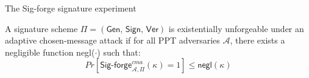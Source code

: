 \begin{algorithm}[h]
		\caption{\label{alg:sig-forge} The \textsf{Sig-forge} signature experiment}
		\begin{algorithmic}[1]
					\State{}
				\EndIf
				\State{}
			\EndFunction
		\end{algorithmic}
\end{algorithm}

\begin{defn}
	\label{def:singature_security}
	A signature scheme $\Pi = (\textsf{Gen, Sign, Ver})$ is \textsf{existentially unforgeable under an adaptive chosen-message attack } if for all PPT adversaries $\mathcal{A}$, there exists a negligible function \textsf{negl($\cdot$)} such that:
	\begin{equation*}
		Pr[\textsf{Sig-forge}^{cma}_{\mathcal{A}, \Pi}(\kappa) = 1] \leq \textsf{negl}(\kappa)
	\end{equation*}
\end{defn}